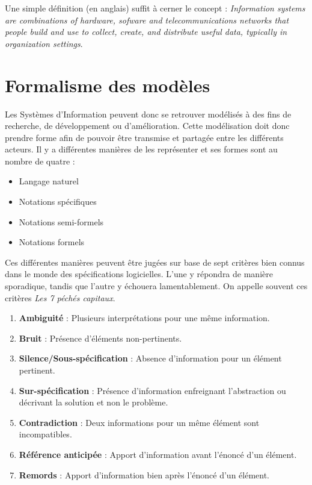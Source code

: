 Une simple définition (en anglais) suffit à cerner le concept : \textit{Information systems are combinations of hardware, sofware and telecommunications networks that people build and use to collect, create, and distribute useful data, typically in organization settings}.

\section{Formalisme des modèles}

Les Systèmes d'Information peuvent donc se retrouver modélisés à des fins de recherche, de développement ou d'amélioration. Cette modélisation doit donc prendre forme afin de pouvoir être transmise et partagée entre les différents acteurs. Il y a différentes manières de les représenter et ses formes sont au nombre de quatre :

\begin{itemize}
  \item Langage naturel
  \item Notations spécifiques
  \item Notations semi-formels
  \item Notations formels
\end{itemize}

Ces différentes manières peuvent être jugées sur base de sept critères bien connus dans le monde des spécifications logicielles. L'une y répondra de manière sporadique, tandis que l'autre y échouera lamentablement. On appelle souvent ces critères \textit{Les 7 péchés capitaux}.

\begin{enumerate}
  \item \textbf{Ambiguité} : Plusieurs interprétations pour une même information.
  \item \textbf{Bruit} : Présence d'éléments non-pertinents.
  \item \textbf{Silence/Sous-spécification} : Absence d'information pour un élément pertinent.
  \item \textbf{Sur-spécification} : Présence d'information enfreignant l'abstraction ou décrivant la solution et non le problème.
  \item \textbf{Contradiction} : Deux informations pour un même élément sont incompatibles.
  \item \textbf{Référence anticipée} : Apport d'information avant l'énoncé d'un élément.
  \item \textbf{Remords} : Apport d'information bien après l'énoncé d'un élément.
\end{enumerate}

